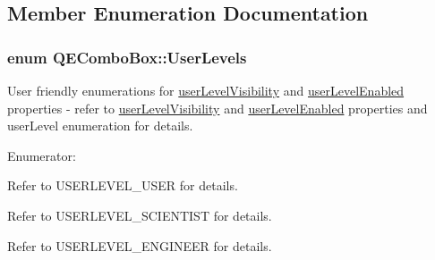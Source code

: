 \subsection{Member Enumeration Documentation}
\hypertarget{classQEComboBox_a7da014f2f323780d302cdf17ff2a5fa8}{
\subsubsection[{UserLevels}]{\setlength{\rightskip}{0pt plus 5cm}enum {\bf QEComboBox::UserLevels}}}
\label{classQEComboBox_a7da014f2f323780d302cdf17ff2a5fa8}
User friendly enumerations for \hyperlink{classQEComboBox_a4f08d8c6154291f534153a6c195be8de}{userLevelVisibility} and \hyperlink{classQEComboBox_af06e9e0b1aaa71c0ceca408ecb9d1a88}{userLevelEnabled} properties -\/ refer to \hyperlink{classQEComboBox_a4f08d8c6154291f534153a6c195be8de}{userLevelVisibility} and \hyperlink{classQEComboBox_af06e9e0b1aaa71c0ceca408ecb9d1a88}{userLevelEnabled} properties and userLevel enumeration for details. \begin{Desc}
\item[Enumerator: ]\par
\begin{description}
\item[{\em 
\hypertarget{classQEComboBox_a7da014f2f323780d302cdf17ff2a5fa8acc97c1c01410fee68db6a4da13871424}{
User}
\label{classQEComboBox_a7da014f2f323780d302cdf17ff2a5fa8acc97c1c01410fee68db6a4da13871424}
}]Refer to USERLEVEL\_\-USER for details. \item[{\em 
\hypertarget{classQEComboBox_a7da014f2f323780d302cdf17ff2a5fa8afaaa01414c1cf1e1f0014bad16cd8fb0}{
Scientist}
\label{classQEComboBox_a7da014f2f323780d302cdf17ff2a5fa8afaaa01414c1cf1e1f0014bad16cd8fb0}
}]Refer to USERLEVEL\_\-SCIENTIST for details. \item[{\em 
\hypertarget{classQEComboBox_a7da014f2f323780d302cdf17ff2a5fa8a141f615a1b2da3b713be0aba91c7a520}{
Engineer}
\label{classQEComboBox_a7da014f2f323780d302cdf17ff2a5fa8a141f615a1b2da3b713be0aba91c7a520}
}]Refer to USERLEVEL\_\-ENGINEER for details. \end{description}
\end{Desc}



